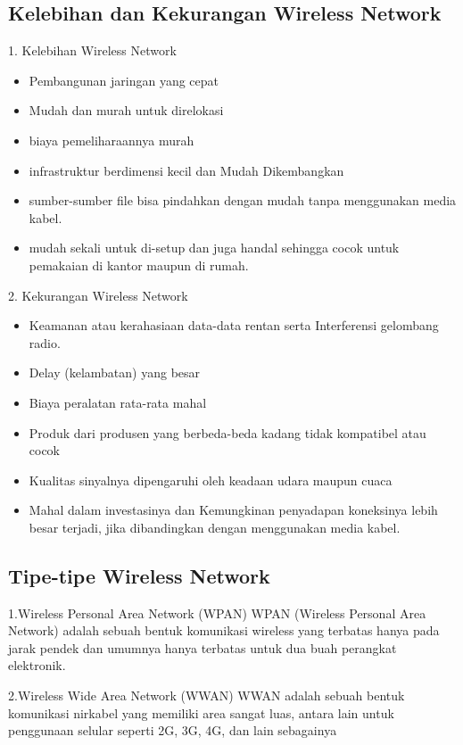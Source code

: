 \documentclass[conference]{IEEEtran}
\begin{document}
\subsection{Kelebihan dan Kekurangan Wireless Network}
1. Kelebihan Wireless Network
\begin{itemize}
    \item  Pembangunan jaringan yang cepat
    \item  Mudah dan murah untuk direlokasi
    \item  biaya pemeliharaannya murah
    \item  infrastruktur berdimensi kecil dan Mudah Dikembangkan
    \item  sumber-sumber file bisa pindahkan dengan   mudah tanpa menggunakan media kabel.
    \item mudah sekali untuk di-setup dan juga handal sehingga cocok untuk pemakaian di kantor maupun di rumah.
\end{itemize}
\vspace{0.1cm}

2. Kekurangan Wireless Network
\begin{itemize}
    \item Keamanan atau kerahasiaan data-data rentan serta Interferensi gelombang radio.
    \item Delay (kelambatan) yang besar
    \item Biaya peralatan rata-rata mahal
    \item Produk dari produsen yang berbeda-beda kadang tidak kompatibel atau cocok
    \item  Kualitas sinyalnya dipengaruhi oleh keadaan udara maupun cuaca
    \item Mahal dalam investasinya dan  Kemungkinan penyadapan koneksinya lebih besar terjadi, jika dibandingkan dengan menggunakan media kabel.
\end{itemize}

\subsection{Tipe-tipe Wireless Network}
1.Wireless Personal Area Network (WPAN)
WPAN (Wireless Personal Area Network) adalah sebuah bentuk komunikasi wireless yang terbatas hanya pada jarak pendek dan umumnya hanya terbatas untuk dua buah perangkat elektronik.
\vspace{5pt}

2.Wireless Wide Area Network (WWAN)
WWAN adalah sebuah bentuk komunikasi nirkabel yang memiliki area sangat luas, antara lain untuk penggunaan selular seperti 2G, 3G, 4G, dan lain sebagainya
\vspace{5pt}
\end{document}
